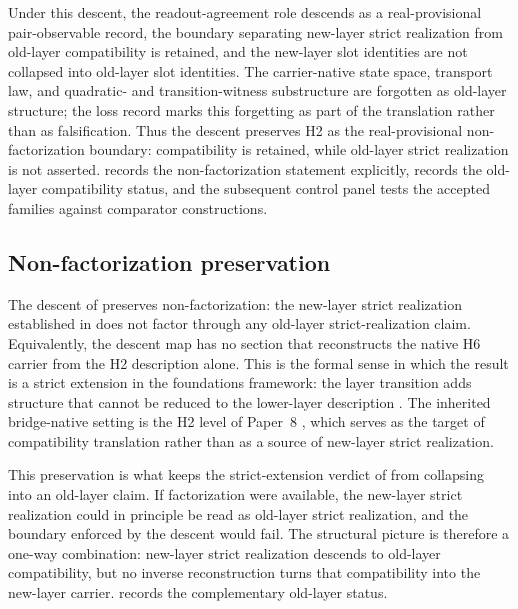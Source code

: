 \documentclass[11pt]{article}
\newcommand{\OldLayer}{H2}
\newcommand{\NewLayer}{H6}
\newcommand{\PaperEight}{Paper~8}
\newcommand{\OldLayerStatus}{real-provisional non-factorization boundary}
\theoremstyle{definition}
\begin{document}
Under this descent, the readout-agreement role descends as a real-provisional
pair-observable record, the boundary separating new-layer strict realization
from old-layer compatibility is retained, and the new-layer slot identities are
not collapsed into old-layer slot identities.  The carrier-native state space,
transport law, and quadratic- and transition-witness substructure are forgotten
as old-layer structure; the loss record marks this forgetting as part of the
translation rather than as falsification.  Thus the descent preserves
\OldLayer{} as the \OldLayerStatus{}: compatibility is retained, while
old-layer strict realization is not asserted.  
records the non-factorization statement explicitly, 
records the old-layer compatibility status, and the subsequent control panel
tests the accepted families against comparator constructions.

\subsection{Non-factorization preservation}\label{subsec:non-factorization-preservation}

The descent of  preserves non-factorization: the
new-layer strict realization established in  does not
factor through any old-layer strict-realization claim.  Equivalently, the
descent map has no section that reconstructs the native \NewLayer{} carrier
from the \OldLayer{} description alone.  This is the formal sense in which the
result is a strict extension in the foundations framework: the layer transition
adds structure that cannot be reduced to the lower-layer description
\cite{Tsiokos2026FoundationsII}.  The inherited bridge-native setting is the
\OldLayer{} level of \PaperEight{} \cite{Tsiokos2026CarrierToEvent}, which
serves as the target of compatibility translation rather than as a source of
new-layer strict realization.

This preservation is what keeps the strict-extension verdict of
 from collapsing into an old-layer claim.  If
factorization were available, the new-layer strict realization could in
principle be read as old-layer strict realization, and the boundary enforced by
the descent would fail.  The structural picture is therefore a one-way
combination: new-layer strict realization descends to old-layer compatibility,
but no inverse reconstruction turns that compatibility into the new-layer
carrier.   records the complementary
old-layer status.
\end{document}
